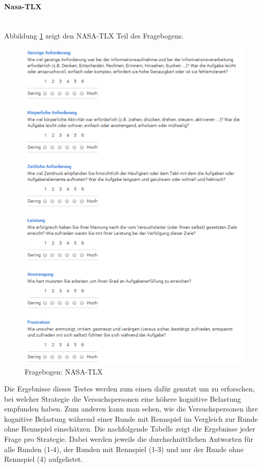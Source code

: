 \documentclass[12pt,a4paper]{scrartcl}
\begin{document}
\paragraph{Nasa-TLX}
~\\
Abbildung \ref{fbnasatlx1} zeigt den NASA-TLX Teil des Fragebogens. 
\begin{figure}[htbp]
\begin{center}
\includegraphics[width=12cm]{nasa.png}
\caption{Fragebogen: NASA-TLX}
\label{fbnasatlx1}
\end{center}
\end{figure}
Die Ergebnisse dieses Testes werden zum einen dafür genutzt um zu erforschen, bei welcher Strategie die Versuchspersonen eine höhere kognitive Belastung empfunden haben. Zum anderen kann man sehen, wie die Versuchspersonen ihre kognitive Belastung während einer Runde mit Rennspiel im Vergleich zur Runde ohne Rennspiel einschätzen. 
Die nachfolgende Tabelle zeigt die Ergebnisse jeder Frage pro Strategie. Dabei werden jeweils die durchschnittlichen Antworten für alle Runden (1-4), der Runden mit Rennspiel (1-3) und nur der Runde ohne Rennspiel (4) aufgelistet. 
\end{document}

